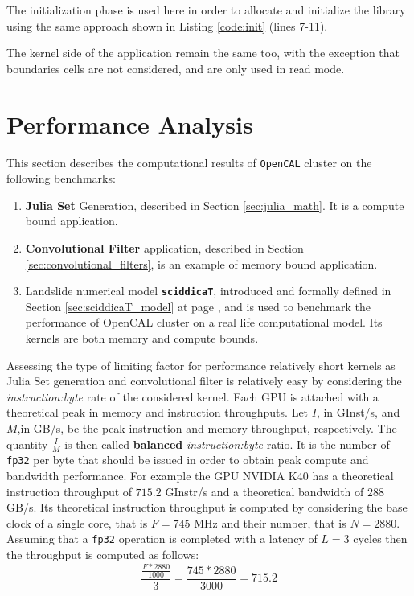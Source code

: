 The initialization phase is used here in order to allocate and initialize the library using the same approach shown in Listing \ref{code:init} (lines 7-11).

The kernel side of the application remain the same too, with the exception that boundaries cells are not considered, and are only used in read mode. 

\section{Performance Analysis}
This section describes the computational results of \texttt{OpenCAL} cluster on the following benchmarks:

\begin{enumerate}
	\item \textbf{Julia Set} Generation, described in Section \ref{sec:julia_math}. It is a compute bound application.
	\item \textbf{Convolutional Filter} application, described in Section \ref{sec:convolutional_filters}, is an example of memory bound application.
	\item Landslide numerical model \texttt{\textbf{sciddicaT}}, introduced and formally defined in Section \ref{sec:sciddicaT_model} at page \pageref{sec:sciddicaT_model}, and is used to benchmark the performance of OpenCAL cluster on a real life computational model. Its kernels are both memory and compute bounds.
\end{enumerate}
Assessing the type of limiting factor for performance relatively short kernels as Julia Set generation and convolutional filter is relatively easy by considering the \textit{instruction:byte} rate of the considered kernel.
Each GPU is attached with a theoretical peak in memory and instruction throughputs\cite{Volkov:EECS-2016-143}.
Let $I$, in \si{GInst/s}, and $M$,in \si{GB/s}, be the peak instruction and memory throughput, respectively. The quantity $\frac{I}{M}$ is then called \textbf{balanced} \textit{instruction:byte} ratio. It is the number of \texttt{fp32} per byte that should be issued in order to obtain peak compute and bandwidth performance.
For example the GPU NVIDIA K40 has a theoretical instruction throughput of $715.2$ \si{GInstr/s} and a theoretical bandwidth of $288$ \si{GB/s}. 
Its theoretical instruction throughput is computed by considering the base clock of a single core, that is $F=745$ \si{MHz} and their number, that is $N=2880$. Assuming that a \texttt{fp32} operation is completed with a latency of $L=3$ cycles then the throughput is computed as follows:
\[
	\frac{\frac{F*2880}{1000}}{3} = \frac{745*2880}{3000} = 715.2
\]

